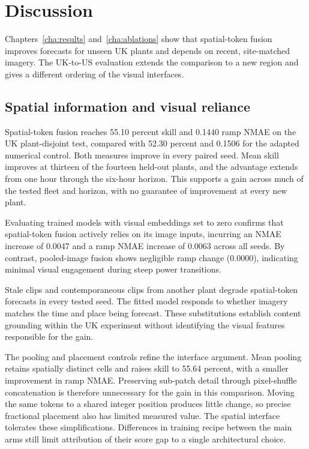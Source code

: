 \chapter{Discussion}
\label{cha:discussion}

Chapters~\ref{cha:results} and~\ref{cha:ablations} show that spatial-token fusion improves forecasts for unseen UK plants and depends on recent, site-matched imagery. The UK-to-US evaluation extends the comparison to a new region and gives a different ordering of the visual interfaces.

\section{Spatial information and visual reliance}

Spatial-token fusion reaches 55.10 percent skill and 0.1440 ramp NMAE on the UK plant-disjoint test, compared with 52.30 percent and 0.1506 for the adapted numerical control. Both measures improve in every paired seed. Mean skill improves at thirteen of the fourteen held-out plants, and the advantage extends from one hour through the six-hour horizon. This supports a gain across much of the tested fleet and horizon, with no guarantee of improvement at every new plant.

Evaluating trained models with visual embeddings set to zero confirms that spatial-token fusion actively relies on its image inputs, incurring an NMAE increase of 0.0047 and a ramp NMAE increase of 0.0063 across all seeds. By contrast, pooled-image fusion shows negligible ramp change (0.0000), indicating minimal visual engagement during steep power transitions.

Stale clips and contemporaneous clips from another plant degrade spatial-token forecasts in every tested seed. The fitted model responds to whether imagery matches the time and place being forecast. These substitutions establish content grounding within the UK experiment without identifying the visual features responsible for the gain.

The pooling and placement controls refine the interface argument. Mean pooling retains spatially distinct cells and raises skill to 55.64 percent, with a smaller improvement in ramp NMAE. Preserving sub-patch detail through pixel-shuffle concatenation is therefore unnecessary for the gain in this comparison. Moving the same tokens to a shared integer position produces little change, so precise fractional placement also has limited measured value. The spatial interface tolerates these simplifications. Differences in training recipe between the main arms still limit attribution of their score gap to a single architectural choice.

